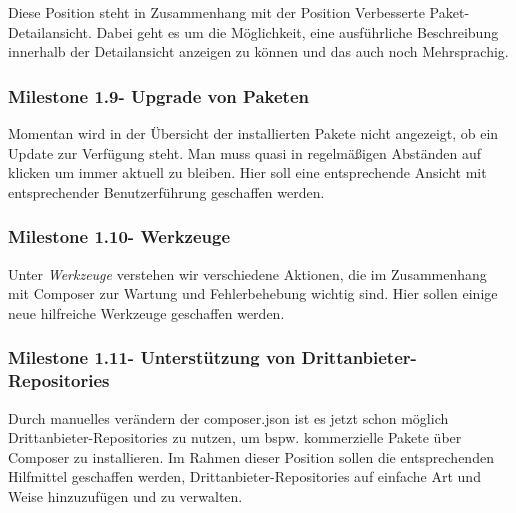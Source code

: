 \documentclass[
paper=a4,
draft=false,%
fontsize=10pt%
]{scrartcl}
\begin{document}
Diese Position steht in Zusammenhang mit der Position Verbesserte Paket-Detailansicht. Dabei geht es um die Möglichkeit, eine ausführliche Beschreibung innerhalb der Detailansicht anzeigen zu können und das auch noch Mehrsprachig.

\subsubsection[Milestone 1.9 - Upgrade von Paketen]{Milestone 1.9\footnotemark - Upgrade von Paketen}

Momentan wird in der Übersicht der installierten Pakete nicht angezeigt, ob ein Update zur Verfügung steht. Man muss quasi in regelmäßigen Abständen auf  klicken um immer aktuell zu bleiben. Hier soll eine entsprechende Ansicht mit entsprechender Benutzerführung geschaffen werden.

\subsubsection[Milestone 1.10 - Werkzeuge]{Milestone 1.10\footnotemark - Werkzeuge}

Unter \emph{Werkzeuge} verstehen wir verschiedene Aktionen, die im Zusammenhang mit Composer zur Wartung und Fehlerbehebung wichtig sind. Hier sollen einige neue hilfreiche Werkzeuge geschaffen werden.

\subsubsection[Milestone 1.11 - Unterstützung von Drittanbieter-Repositories]{Milestone 1.11\footnotemark - Unterstützung von Drittanbieter-Repositories}

Durch manuelles verändern der composer.json ist es jetzt schon möglich Drittanbieter-Repositories zu nutzen, um bspw. kommerzielle Pakete über Composer zu installieren. Im Rahmen dieser Position sollen die entsprechenden Hilfmittel geschaffen werden, Drittanbieter-Repositories auf einfache Art und Weise hinzuzufügen und zu verwalten.
\end{document}
